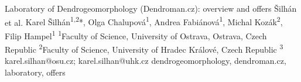 {
}

\abstract
{Laboratory of Dendrogeomorphology (Dendroman.cz): overview and offers} 
{Šilhán et al.} 
{Karel Šilhán\textsuperscript{1,2}*, Olga Chalupová\textsuperscript{1}, Andrea Fabiánová\textsuperscript{1}, Michal Kozák\textsuperscript{2}, Filip Hampel\textsuperscript{1}} 
{\POtag} 
{
	\textsuperscript{1}Faculty of Science, University of Ostrava, Ostrava, Czech Republic
	\textsuperscript{2}Faculty of Science, University of Hradec Králové, Czech Republic
	\textsuperscript{3}
}
{karel.silhan@osu.cz; karel.silhan@uhk.cz}  %
{dendrogeomorphology, dendroman.cz, laboratory, offers}
